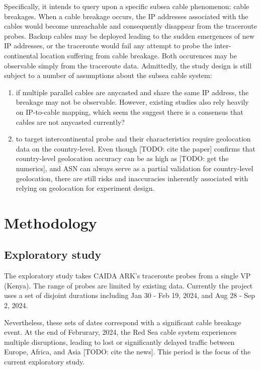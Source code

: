 \documentclass[twocolumn]{article}
\begin{document}
Specifically, it intends to query upon a specific subsea cable phenomenon: cable breakages. When a cable breakage occurs, the IP addresses associated with the cables would become unreachable and consequently disappear from the traceroute probes. Backup cables may be deployed leading to the sudden emergences of new IP addresses, or the traceroute would fail any attempt to probe the inter-continental location suffering from cable breakage. Both occurences may be observable simply from the traceroute data.
Admittedly, the study design is still subject to a number of assumptions about the
subsea cable system:

\begin{enumerate}

    \item if multiple parallel cables are anycasted and share the same IP address, the breakage may not be observable. However, existing studies also rely heavily on IP-to-cable mapping, which seem the suggest there is a consensus that cables are not anycasted currently?
        
    \item to target intercontinental probe and their characteristics require geolocation data on the country-level. Even though [TODO: cite the paper] confirms that country-level geolocation accuracy can be as high as [TODO: get the numerics], and ASN can always serve as a partial validation for country-level geolocation, there are still risks and inaccuracies inherently associated with relying on geolocation for experiment design.

\end{enumerate}

\section{Methodology}

\subsection{Exploratory study}
The exploratory study takes CAIDA ARK's traceroute probes from a single VP (Kenya). The range of probes are limited by existing data. Currently the project uses a set of disjoint durations including Jan 30 - Feb 19, 2024, and Aug 28 - Sep 2, 2024.

Nevertheless, these sets of dates correspond with a significant cable breakage event. At the end of Februrary, 2024, the Red Sea cable system experiences multiple disruptions, leading to lost or significantly delayed traffic between Europe, Africa, and Asia [TODO: cite the news]. This period is the focus of the current exploratory study. 
\end{document}
